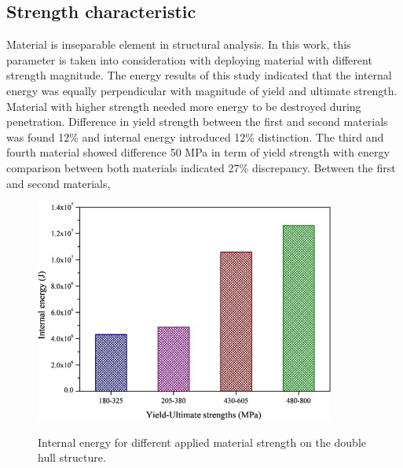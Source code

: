 \documentclass[../Final.tex]{subfiles}
\begin{document}
\subsection{Strength characteristic}

Material is inseparable element in structural analysis. In this work, this parameter is taken into consideration with deploying material with different strength magnitude. 
The energy results of this study indicated that the internal energy was equally perpendicular with magnitude of yield and ultimate strength. 
Material with higher strength needed more energy to be destroyed during penetration. Difference in yield strength between the first and second materials was found 12\% and internal energy introduced 12\% distinction. 
The third and fourth material showed difference 50 MPa in term of yield strength with energy comparison between both materials indicated 27\% discrepancy. Between the first and second materials, 

\begin{figure}[h]
    \centering
    \includegraphics[width=\columnwidth]{fig9.jpg}
    \label{fig9}
    \caption{Internal energy for different applied material strength on the double hull structure.}
\end{figure}
\end{document}
